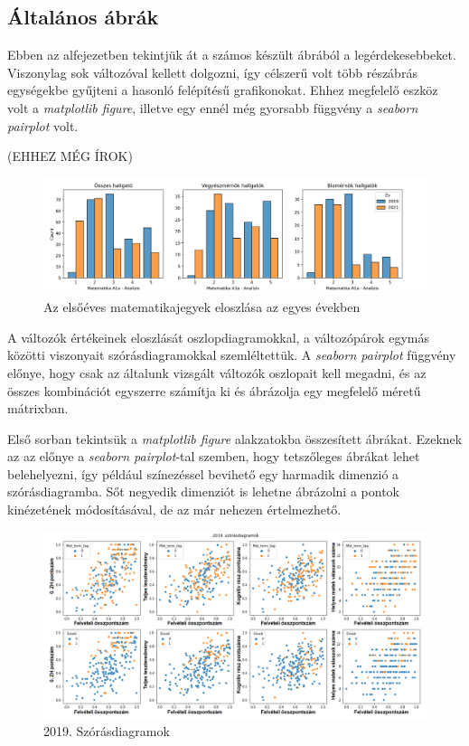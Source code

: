 \documentclass[12pt]{article}
\begin{document}
\subsection{Általános ábrák}

Ebben az alfejezetben tekintjük át a számos készült ábrából a legérdekesebbeket. Viszonylag sok változóval kellett dolgozni, így célszerű volt több részábrás egységekbe gyűjteni a hasonló felépítésű grafikonokat. Ehhez megfelelő eszköz volt a \textit{matplotlib figure}, illetve egy ennél még gyorsabb függvény a \textit{seaborn pairplot} volt.

(EHHEZ MÉG ÍROK)
\begin{figure}[H]
\centering
\includegraphics[width=\textwidth]{kepek/jegyek_eloszlas.png}
\caption{Az elsőéves matematikajegyek eloszlása az egyes években}
\end{figure}

A változók értékeinek eloszlását oszlopdiagramokkal, a változópárok egymás közötti viszonyait szórásdiagramokkal szemléltettük. A \textit{seaborn pairplot} függvény előnye, hogy csak az általunk vizsgált változók oszlopait kell megadni, és az összes kombinációt egyszerre számítja ki és ábrázolja egy megfelelő méretű mátrixban.

Első sorban tekintsük a \textit{matplotlib figure} alakzatokba összesített ábrákat. Ezeknek az az előnye a \textit{seaborn pairplot}-tal szemben, hogy tetszőleges ábrákat lehet belehelyezni, így például színezéssel bevihető egy harmadik dimenzió a szórásdiagramba. Sőt negyedik dimenziót is lehetne ábrázolni a pontok kinézetének módosításával, de az már nehezen értelmezhető.

\begin{figure}[H]
\centering
\includegraphics[width=\textwidth]{kepek/2019scatter.png}
\caption{2019. Szórásdiagramok}
\label{fig:2019scatter}
\end{figure}
\end{document}
